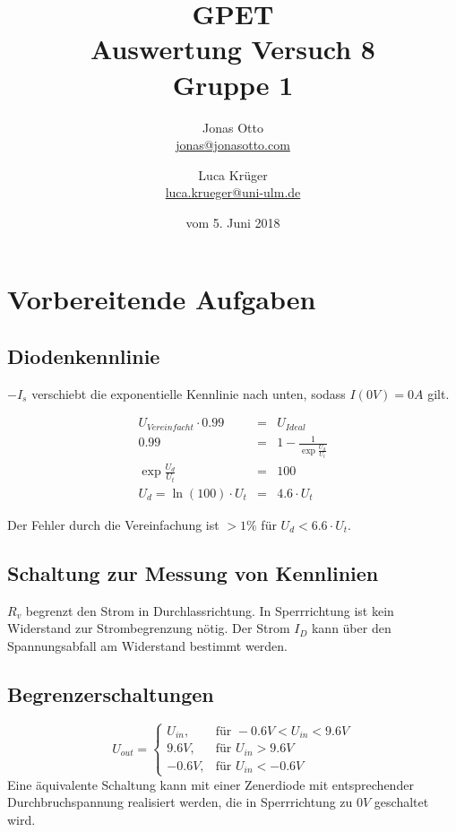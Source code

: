 \documentclass[a4paper]{article}
\title{GPET\\ Auswertung Versuch 8\\ Gruppe 1}
\author{Jonas Otto\\ \href{mailto:jonas@jonasotto.com}{jonas@jonasotto.com} 
   \and Luca Krüger \\ \href{mailto:luca.krueger@uni-ulm.de}{luca.krueger@uni-ulm.de} }
\date{vom 5. Juni 2018}
\begin{document}
    
\maketitle
\newpage

\section{Vorbereitende Aufgaben}

\subsection{Diodenkennlinie}
$-I_s$ verschiebt die exponentielle Kennlinie nach unten, sodass $I(0\si{V})=0\si{A}$ gilt.


\begin{eqnarray*}
    U_{Vereinfacht} \cdot 0.99 &=& U_{Ideal}\\
    0.99 &=& 1-\frac{1}{\exp{\frac{U_d}{U_t}}}\\
    \exp{\frac{U_d}{U_t}} &=& 100\\
    U_d=\ln{(100)} \cdot U_t &=& 4.6 \cdot U_t
\end{eqnarray*}

Der Fehler durch die Vereinfachung ist $>1\%$ für $U_d < 6.6 \cdot U_t$.

\subsection{Schaltung zur Messung von Kennlinien}
$R_v$ begrenzt den Strom in Durchlassrichtung.
In Sperrrichtung ist kein Widerstand zur Strombegrenzung nötig.
Der Strom $I_D$ kann über den Spannungsabfall am Widerstand bestimmt werden.

\subsection{Begrenzerschaltungen}

\[
    U_{out} = 
    \begin{cases}
        U_{in},& \text{für } -0.6\si{V} < U_{in} < 9.6\si{V}\\
        9.6\si{V},& \text{für } U_{in} > 9.6\si{V}\\
        -0.6\si{V},& \text{für } U_{in} < -0.6\si{V}
    \end{cases}
\]
Eine äquivalente Schaltung kann mit einer Zenerdiode mit entsprechender Durchbruchspannung realisiert werden, die in Sperrrichtung zu $0V$ geschaltet wird.
\end{document}
